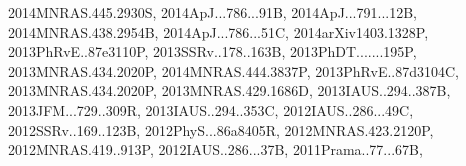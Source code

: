 \documentclass[12pt]{article}
\begin{document}
\begin{enumerate}
\begin{enumerate}
{2014MNRAS.445.2930S,%
2014ApJ...786...91B,%
2014ApJ...791...12B,%
2014MNRAS.438.2954B,%
2014ApJ...786...51C,%
2014arXiv1403.1328P,%
2013PhRvE..87e3110P,%
2013SSRv..178..163B,%
2013PhDT.......195P,%
2013MNRAS.434.2020P,%
2014MNRAS.444.3837P,%
2013PhRvE..87d3104C,%
2013MNRAS.434.2020P,%
2013MNRAS.429.1686D,%
2013IAUS..294..387B,%
2013JFM...729..309R,%
2013IAUS..294..353C,%
2012IAUS..286...49C,%
2012SSRv..169..123B,%
2012PhyS...86a8405R,%
2012MNRAS.423.2120P,%
2012MNRAS.419..913P,%
2012IAUS..286...37B,%
2011Prama..77...67B,%
}
\end{enumerate}
\end{enumerate}
\end{document}
